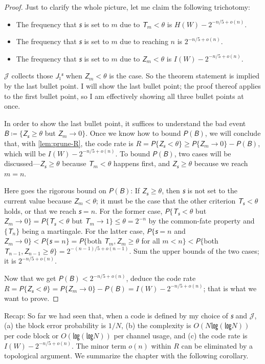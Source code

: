 \documentclass[openany]{amsbook}
\numberwithin{equation}{chapter}
\numberwithin{figure}{chapter}
\numberwithin{table}{chapter}
\theoremstyle{definition}	理dfn:Definition~?s			理exa:Example~?s
\theoremstyle{remark}		理cla:Claim~?s				理rem:Remark~?s
\begin{document}
	\begin{proof}
		Just to clarify the whole picture, let me claim the following trichotomy:
		\begin{itemize}
			\item	The frequency that $𝘴$ is set to $m$
					due to $𝘛_m<θ$ is $H(W)-2^{-n/5+o(n)}$.
			\item	The frequency that $𝘴$ is set to $m$
					due to reaching $n$ is $2^{-n/5+o(n)}$.
			\item	The frequency that $𝘴$ is set to $m$
					due to $𝘡_m<θ$ is $I(W)-2^{-n/5+o(n)}$.
		\end{itemize}
		$𝒥$ collects those $𝘑₁^𝘴$ when $𝘡_m<θ$ is the case.
		So the theorem statement is implied by the last bullet point.
		I will show the last bullet point;
		the proof thereof applies to the first bullet point,
		so I am effectively showing all three bullet points at once.
		
		In order to show the last bullet point,
		it suffices to understand the bad event $𝘉≔\{𝘡_𝘴≥θ$ but $𝘡_m→0\}$.
		Once we know how to bound $𝘗(𝘉)$, we will conclude that,
		with \cref{lem:prune-R}, the code rate is $R=𝘗\{𝘡_𝘴<θ\}≥𝘗\{𝘡_m→0\}-𝘗(𝘉)$,
		which will be $I(W)-2^{-n/5+o(n)}$.
		To bound $𝘗(𝘉)$, two cases will be discussed---$𝘡_𝘴≥θ$ because
		$𝘛_m<θ$ happens first, and $𝘡_𝘴≥θ$ because we reach $m=n$.
		
		Here goes the rigorous bound on $𝘗(𝘉)$:
		If $𝘡_𝘴≥θ$, then $𝘴$ is not set to the current value because $𝘡_m<θ$;
		it must be the case that the other criterion $𝘛_𝘴<θ$ holds,
		or that we reach $𝘴=n$.
		For the former case, $𝘗\{𝘛_𝘴<θ$ but $𝘡_m→0\}=𝘗\{𝘛_𝘴<θ$ but $𝘛_m→1\}≤θ=2^{-n}$
		by the common-fate property and $\{𝘛_n\}$ being a martingale.
		For the latter case,
		$𝘗\{𝘴=n$ and $𝘡_m→0\}<𝘗\{𝘴=n\}=𝘗\{$both $𝘛_m,𝘡_m≥θ$ for all $m<n\}
			<𝘗\{$both $𝘛_{n-1},𝘡_{n-1}≥θ\}=2^{-(n-1)/5+o(n-1)}$.
		Sum the upper bounds of the two cases;
		it is $2^{-n/5+o(n)}$.
		
		Now that we get $𝘗(𝘉)<2^{-n/5+o(n)}$, deduce the code rate
		$R=𝘗\{𝘡_𝘴<θ\}=𝘗\{𝘡_m→0\}-𝘗(𝘉)=I(W)-2^{-n/5+o(n)}$;
		that is what we want to prove.
	\end{proof}
	
	Recap:
	So far we had seen that, when a code is defined by my choice of $𝘴$ and $𝒥$,
	(a)	the block error probability is $1/N$,
	(b)	the complexity is $O(N㏒(㏒N))$ per code block
		or $O(㏒(㏒N))$ per channel usage, and
	(c)	the code rate is $I(W)-2^{-n/5+o(n)}$.
	The minor term $o(n)$ within $R$ can be eliminated by a topological argument.
	We summarize the chapter with the following corollary.
	
\end{document}
